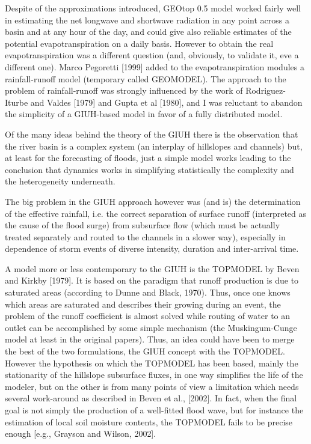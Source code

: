 Despite of the approximations introduced, GEOtop 0.5 model worked fairly well in estimating the net longwave and shortwave radiation in any point across a basin and at any hour of the day, and could give also reliable estimates of the potential evapotranspiration on a daily basis. However to obtain the real evapotranspiration was a different question (and, obviously, to validate it, eve a different one).  
Marco Pegoretti [1999] added to the evapotranspiration modules a rainfall-runoff model (temporary called GEOMODEL). The approach to the problem of rainfall-runoff  was strongly influenced by the work of Rodriguez-Iturbe and Valdes [1979] and Gupta et al [1980],  and I was reluctant to abandon the simplicity of a GIUH-based model in favor of a fully distributed model. 

Of the many ideas behind the theory of the GIUH there is the observation that the river basin is a complex system (an interplay of hillslopes and channels) but, at least for the forecasting of floods, just a simple model works leading to the conclusion that dynamics works in simplifying  statistically the complexity and the heterogeneity underneath.

The big problem in the GIUH approach however was (and is) the determination of the effective rainfall, i.e. the correct separation of surface runoff (interpreted as the cause of the flood surge) from subsurface flow (which must be actually treated separately and routed to the channels in a slower way), especially in dependence of storm events of diverse intensity, duration and inter-arrival time. 

A model more or less contemporary to the GIUH is the TOPMODEL by Beven and Kirkby [1979]. It is based on the paradigm that runoff production is due to saturated areas (according to Dunne and Black, 1970). Thus, once one knows which areas are saturated and describes their growing during an event, the problem of the runoff coefficient is almost solved while routing of water to an outlet can be accomplished by some simple mechanism (the Muskingum-Cunge model at least in the original papers). 
Thus, an idea could have been to merge the best of the two formulations, the GIUH concept with the TOPMODEL. However the hypothesis on which the TOPMODEL has been based, mainly the stationarity of the hillslope subsurface fluxes,  in one way simplifies the life of the modeler, but on the other is from many points of view a limitation which needs several work-around as described in  Beven et al., [2002]. In fact, when the final goal is not simply the production of a well-fitted flood wave, but for instance the estimation of local soil moisture contents, the TOPMODEL fails to be precise enough [e.g., Grayson and Wilson, 2002]. 

